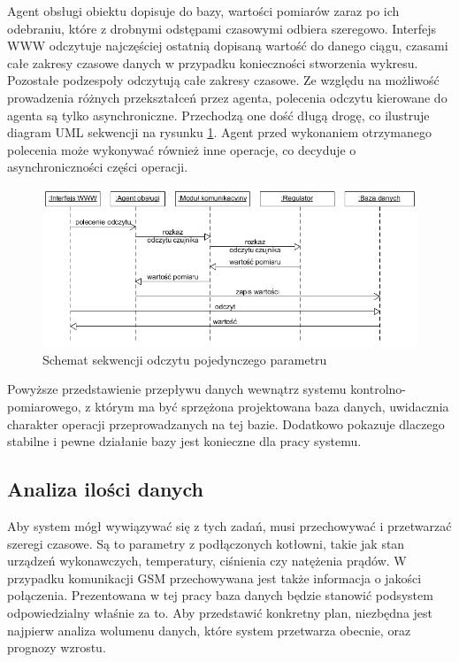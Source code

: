 \documentclass[a4paper,polish,12pt,twoside]{article}
\begin{document}
Agent obsługi obiektu dopisuje do bazy, wartości pomiarów zaraz po ich odebraniu, które z drobnymi odstępami czasowymi odbiera szeregowo. Interfejs WWW odczytuje najczęściej ostatnią dopisaną wartość do danego ciągu, czasami całe zakresy czasowe danych w przypadku konieczności stworzenia wykresu. Pozostałe podzespoły odczytują całe zakresy czasowe. Ze względu na możliwość prowadzenia różnych przekształceń przez agenta, polecenia odczytu kierowane do agenta są tylko asynchroniczne. Przechodzą one dość długą drogę, co ilustruje diagram UML sekwencji na rysunku \ref{fig:smokarc_seqdg}. Agent przed wykonaniem otrzymanego polecenia może wykonywać również inne operacje, co decyduje o asynchroniczności części operacji.

\begin{figure}[h]
	\centering \includegraphics[width=15cm]{smokarc_seqdg}
	\caption{Schemat sekwencji odczytu pojedynczego parametru}
	\label{fig:smokarc_seqdg}
\end{figure}

Powyższe przedstawienie przepływu danych wewnątrz systemu kontrolno-pomiarowego, z którym ma być sprzężona projektowana baza danych, uwidacznia charakter operacji przeprowadzanych na tej bazie. Dodatkowo pokazuje dlaczego stabilne i pewne działanie bazy jest konieczne dla pracy systemu.

\subsection{Analiza ilości danych}
\label{sec:data_quantity_analysis}
Aby system mógł wywiązywać się z tych zadań, musi przechowywać i przetwarzać szeregi czasowe. Są to parametry z podłączonych kotłowni, takie jak stan urządzeń wykonawczych, temperatury, ciśnienia czy natężenia prądów. W przypadku komunikacji GSM przechowywana jest także informacja o jakości połączenia. Prezentowana w tej pracy baza danych będzie stanowić podsystem odpowiedzialny właśnie za to. Aby przedstawić konkretny plan, niezbędna jest najpierw analiza wolumenu danych, które system przetwarza obecnie, oraz prognozy wzrostu.
\end{document}
